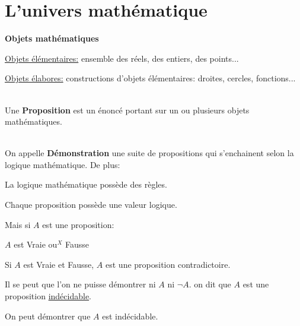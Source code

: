 \documentclass[12pt,twoside,a4paper]{article}
\author{MPSI 2}
\begin{document}
	\maketitle
	\section{L'univers math\'ematique}
		\begin{liste}
			\item\textbf{Objets math\'ematiques}
				\begin{tab}\begin{liste}
					\item \underline{Objets \'el\'ementaires:} ensemble des r\'eels, des entiers, des points...
					\item \underline{Objets \'elabores:} constructions d'objets \'el\'ementaires: droites, cercles, fonctions...\\\\
				\end{liste}\end{tab}
			\item Une \textbf{Proposition} est un \'enonc\'e portant sur un ou plusieurs objets math\'ematiques.\\\\
			\item On appelle \textbf{D\'emonstration} une suite de propositions qui s'enchainent selon la logique math\'ematique. De plus:
				\begin{liste}
					\item La logique math\'ematique poss\`ede des r\`egles.
					\item Chaque proposition poss\`ede une valeur logique.\\
				\end{liste}
				Mais si $A$ est une proposition:
				\begin{liste}
					\item $A$ est Vraie ou$^X$ Fausse
					\item Si $A$ est Vraie et Fausse, $A$ est une proposition contradictoire.
					\item Il se peut que l'on ne puisse d\'emontrer ni $A$ ni $\neg A$. on dit que $A$ est une proposition \underline{ind\'ecidable}.
					\item On peut d\'emontrer que $A$ est ind\'ecidable.
				\end{liste}
		\end{liste}
\end{document}
